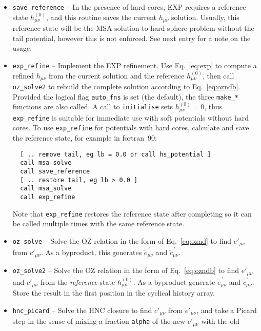 \documentclass[12pt,a4paper]{article}
\newcommand{\myprime}{^{{}\,\prime}}
\newcommand{\href}{h^{(0)}}
\newcommand{\Eqref}[1]{Eq.~\eqref{#1}}
\newcommand{\FORTRAN}{{\sc fortran}}
\begin{document}
\begin{itemize}
  called multiple times with different densities for a given
  potential, or the potential can be reset between calls.  The RPA
  closure cannot be used with hard cores (see section \ref{sec:RPA}).
%
\item\verb+save_reference+ -- In the presence of hard cores, EXP
  requires a reference state $\href_{\mu\nu}$, and this routine saves
  the current $h_{\mu\nu}$ solution.  Usually, this reference state
  will be the MSA solution to hard sphere problem without the tail
  potential, however this is not enforced.  See next entry for a note
  on the usage.
%
\item\verb+exp_refine+ -- Implement the EXP refinement.  Use
  \Eqref{eq:exp} to compute a refined $h_{\mu\nu}$ from the current
  solution and the reference $\href_{\mu\nu}$, then call
  \verb+oz_solve2+ to rebuild the complete solution according to
  \Eqref{eq:ozndb}.  Provided the logical flag \verb+auto_fns+ is set
  (the default), the three \verb+make_*+ functions are also called.  A
  call to \verb+initialise+ sets $\href_{\mu\nu}=0$, thus
  \verb+exp_refine+ is suitable for immediate use with soft potentials
  without hard cores.  To use \verb+exp_refine+ for potentials with
  hard cores, calculate and save the reference state, for example
  in \FORTRAN\ 90:
%
\begin{verbatim}
  [ .. remove tail, eg lb = 0.0 or call hs_potential ]
  call msa_solve
  call save_reference
  [ .. restore tail, eg lb > 0.0 ]
  call msa_solve
  call exp_refine
\end{verbatim}
%
Note that \verb+exp_refine+ restores the reference state after
completing so it can be called multiple times with the same reference
state.
%
\item\verb+oz_solve+ -- Solve the OZ relation in the form of
  \Eqref{eq:oznd} to find $e'_{\mu\nu}$ from $c'_{\mu\nu}$.  As a
  byproduct, this generates ${\tilde e}_{\mu\nu}\myprime$ and ${\tilde
    c}_{\mu\nu}\myprime$.
%
\item\verb+oz_solve2+ -- Solve the OZ relation in the form of
  \Eqref{eq:ozndb} to find $e'_{\mu\nu}$ and $c'_{\mu\nu}$ from the
  \emph{reference} state $\href_{\mu\nu}$.  As a byproduct generate
  ${\tilde e}_{\mu\nu}\myprime$ and ${\tilde c}_{\mu\nu}\myprime$.
  Store the result in the first position in the cyclical history
  array.
%
\item\verb+hnc_picard+ -- Solve the HNC closure to find $c'_{\mu\nu}$
  from $e'_{\mu\nu}$, and take a Picard step in the sense of mixing a
  fraction \verb+alpha+ of the new $c'_{\mu\nu}$ with the old

\end{itemize}
\end{document}
